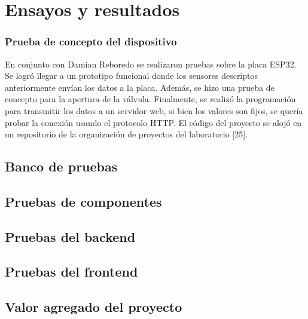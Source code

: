 \chapter{Ensayos y resultados} %

\subsection{Prueba de concepto del dispositivo}
En conjunto con Damian Reboredo se realizaron pruebas sobre la placa ESP32. Se logró llegar a un prototipo funcional donde los sensores descriptos anteriormente envían los datos a la placa. Además, se hizo una prueba de concepto para la apertura de la válvula. Finalmente, se realizó la programación para transmitir los datos a un servidor web, si bien los valores son fijos, se quería probar la conexión usando el protocolo HTTP. El código del proyecto se alojó en un repositorio de la organización de proyectos del laboratorio [25].


\section{Banco de pruebas}


\section{Pruebas de componentes}


\section{Pruebas del backend}


\section{Pruebas del frontend}


\section{Valor agregado del proyecto}

